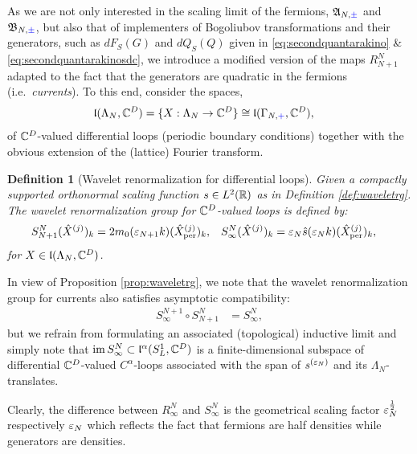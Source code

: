 \documentclass[a4paper, 11pt]{article}
\newcommand{\fA}{\mathfrak{A}}\newcommand{\cA}{\mathcal{A}}\newcommand{\dA}{\mathds{A}}\newcommand{\sA}{\mathscr{A}}
\newcommand{\fB}{\mathfrak{B}}\newcommand{\cB}{\mathcal{B}}\newcommand{\dB}{\mathds{B}}\newcommand{\sB}{\mathscr{B}}
\newcommand{\fl}{\mathfrak{l}}\newcommand{\cl}{\mathcal{l}}
\DeclareMathOperator{\1}{\mathds{1}}
\DeclareMathOperator{\im}{im}
\DeclareMathOperator{\per}{per}
\newtheorem{defn}[thm]{Definition}
\begin{document}
As we are not only interested in the scaling limit of the fermions, $\fA_{N,{\color{blue}\pm}}$ and $\fB_{N,{\color{blue}\pm}}$, but also that of implementers of Bogoliubov transformations and their generators, such as $dF_{S}(G)$ and $dQ_{S}(Q)$ given in \eqref{eq:secondquantarakino} \& \eqref{eq:secondquantarakinosdc}, we introduce a modified version of the maps $R^{N}_{N+1}$ adapted to the fact that the generators are quadratic in the fermions (i.e.~\textit{currents}). To this end, consider the spaces,
\begin{align}
\label{eq:vectcurrents}
\fl(\Lambda_{N},\C^{D}) & = \{X:\Lambda_{N}\rightarrow\C^{D}\} \cong \fl(\Gamma_{N,{\color{blue}+}},\C^{D}),
\end{align}
of $\mathbb{C}^{D}$-valued differential loops (periodic boundary conditions) together with the obvious extension of the (lattice) Fourier transform.
\begin{defn}[Wavelet renormalization for differential loops]
\label{def:waveletrgcur}
Given a compactly supported orthonormal scaling function $s\in L^{2}(\mathbb{R})$ as in Definition \ref{def:waveletrg}. The wavelet renormalization group for $\mathbb{C}^{D}$-valued loops is defined by:
\begin{align}
\label{eq:waveletrgcur}
S^{N}_{N+1}(\hat{X}^{(j)})_{k} & = 2 m_{0}(\vep_{N+1}k)(\hat{X}^{(j)}_{\per})_{k}, & S^{N}_{\infty}(\hat{X}^{(j)})_{k} & = \vep_{N}\hat{s}(\vep_{N}k)(\hat{X}^{(j)}_{\per})_{k},
\end{align}
for $X\in\fl(\Lambda_{N},\C^{D})$.
\end{defn}
In view of Proposition \ref{prop:waveletrg}, we note that the wavelet renormalization group for currents also satisfies asymptotic compatibility:
\begin{align}
\label{eq:waveletrgcurcomp}
S^{N+1}_{\infty}\circ S^{N}_{N+1} & = S^{N}_{\infty},
\end{align}
but we refrain from formulating an associated (topological) inductive limit and simply note that $\im S^{N}_{\infty}\subset \fl^{\alpha}(S^{1}_{L},\C^{D})$ is a finite-dimensional subspace of differential $\mathbb{C}^{D}$-valued $C^{\alpha}$-loops associated with the span of $s^{(\varepsilon_{N})}$ and its $\Lambda_{N}$-translates. 

Clearly, the difference between $R^{N}_{\infty}$ and $S^{N}_{\infty}$ is the geometrical scaling factor $\varepsilon_{N}^{\frac{1}{2}}$ respectively $\varepsilon_{N}$ which reflects the fact that fermions are half densities while generators are densities.
\end{document}
